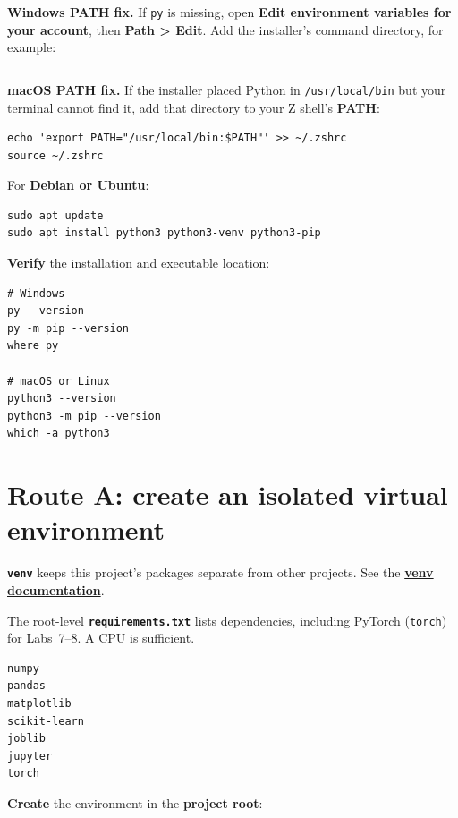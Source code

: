 \textbf{Windows PATH fix.} If \texttt{py} is missing, open \textbf{Edit environment variables for your account}, then \textbf{Path > Edit}. Add the installer's command directory, for example:

\begin{lstlisting}[style=mlterminal]
%LocalAppData%\Python\bin
\end{lstlisting}

\textbf{macOS PATH fix.} If the installer placed Python in \texttt{/usr/local/bin} but your terminal cannot find it, add that directory to your Z shell's \textbf{PATH}:

\begin{lstlisting}[style=mlterminal]
echo 'export PATH="/usr/local/bin:$PATH"' >> ~/.zshrc
source ~/.zshrc
\end{lstlisting}

For \textbf{Debian or Ubuntu}:

\begin{lstlisting}[style=mlterminal]
sudo apt update
sudo apt install python3 python3-venv python3-pip
\end{lstlisting}

\textbf{Verify} the installation and executable location:

\begin{lstlisting}[style=mlterminal]
# Windows
py --version
py -m pip --version
where py

# macOS or Linux
python3 --version
python3 -m pip --version
which -a python3
\end{lstlisting}

\section{Route A: create an isolated virtual environment}

\textbf{\texttt{venv}} keeps this project's packages separate from other projects. See the \href{https://docs.python.org/3/library/venv.html}{\textbf{venv documentation}}.

The root-level \textbf{\texttt{requirements.txt}} lists dependencies, including PyTorch (\texttt{torch}) for Labs~7--8. A CPU is sufficient.

\begin{lstlisting}[style=mlterminal]
numpy
pandas
matplotlib
scikit-learn
joblib
jupyter
torch
\end{lstlisting}

\textbf{Create} the environment in the \textbf{project root}:


